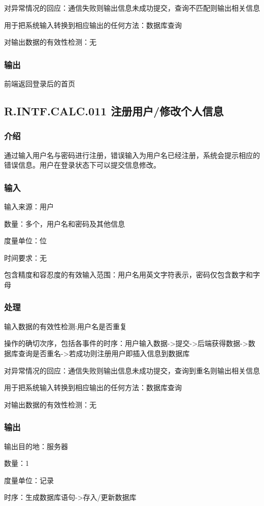 	对异常情况的回应：通信失败则输出信息未成功提交，查询不匹配则输出相关信息

	用于把系统输入转换到相应输出的任何方法：数据库查询

	对输出数据的有效性检测：无
\subsubsection{输出}
		前端返回登录后的首页



\subsection{R.INTF.CALC.011 注册用户/修改个人信息}
\subsubsection{介绍}
通过输入用户名与密码进行注册，错误输入为用户名已经注册，系统会提示相应的错误信息。用户在登录状态下可以提交信息修改。
\subsubsection{输入}
		输入来源：用户

		数量：多个，用户名和密码及其他信息

		度量单位：位

		时间要求：无

		包含精度和容忍度的有效输入范围：用户名用英文字符表示，密码仅包含数字和字母
\subsubsection{处理}
	输入数据的有效性检测:用户名是否重复

	操作的确切次序，包括各事件的时序：用户输入数据->提交->后端获得数据->数据库查询是否重名->若成功则注册用户即插入信息到数据库

	对异常情况的回应：通信失败则输出信息未成功提交，查询到重名则输出相关信息

	用于把系统输入转换到相应输出的任何方法：数据库查询

	对输出数据的有效性检测：无
\subsubsection{输出}
		输出目的地：服务器

		数量：1

		度量单位：记录

		时序：生成数据库语句->存入/更新数据库

